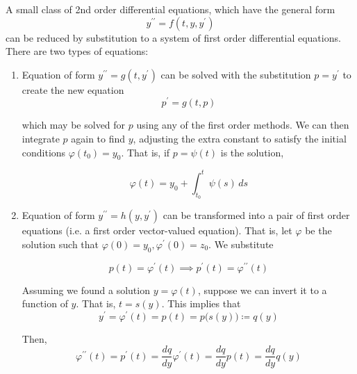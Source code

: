 \documentclass{article}
\begin{document}
    A small class of 2nd order differential equations, which have the general form 
    \begin{equation}
      y^{\prime \prime} = f(t, y, y^\prime)
    \end{equation}
    can be reduced by substitution to a system of first order differential equations. There are two types of equations: 
    \begin{enumerate}
      \item Equation of form $y^{\prime \prime} = g(t, y^\prime)$ can be solved with the substitution $p = y^\prime$ to create the new equation 
      \begin{equation}
        p^\prime = g(t, p)
      \end{equation}

      which may be solved for $p$ using any of the first order methods. We can then integrate $p$ again to find $y$, adjusting the extra constant to satisfy the initial conditions $\varphi(t_0) = y_0$. That is, if $p = \psi(t)$ is the solution, 

        \begin{equation}
          \varphi (t) = y_0 + \int_{t_0}^t \psi (s) \,ds
        \end{equation}

      \item Equation of form $y^{\prime \prime} = h(y, y^\prime)$ can be transformed into a pair of first order equations (i.e. a first order vector-valued equation). That is, let $\varphi$ be the solution such that $\varphi(0) = y_0, \varphi^\prime(0) = z_0$. We substitute 

        \begin{equation}
          p(t) = \varphi^\prime (t) \implies p^\prime (t) = \varphi^{\prime \prime} (t)
        \end{equation}

      Assuming we found a solution $y = \varphi(t)$, suppose we can invert it to a function of $y$. That is, $t = s(y)$. This implies that
        \begin{equation}
          y^\prime = \varphi^\prime (t) = p(t) = p\big( s(y) \big) \coloneqq q(y)
        \end{equation}

      Then,
        \begin{equation}
          \varphi^{\prime \prime} (t) = p^\prime (t) = \frac{d q}{d y} \varphi^\prime (t) = \frac{d q}{d y} p(t) = \frac{d q}{d y} q(y)
        \end{equation}


\end{enumerate}
\end{document}
